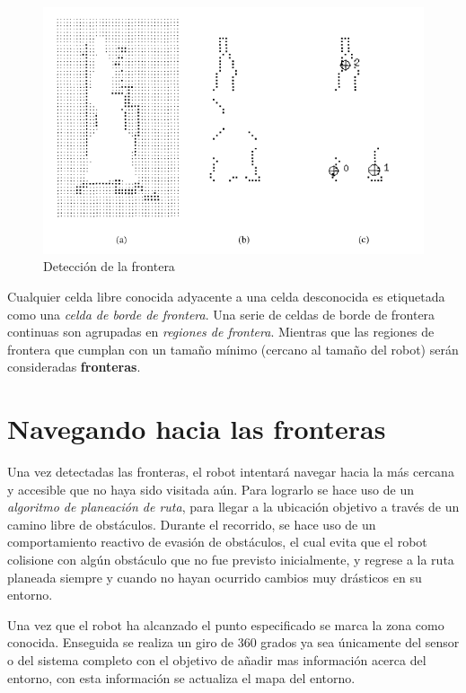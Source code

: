 \documentclass[11pt]{article}
\begin{document}
\begin{figure}
	\centering
	\includegraphics[scale=0.5]{images/frontier_detection.PNG}
	\caption{Detección de la frontera}
	\label{fig:frontier1}
\end{figure}

Cualquier celda libre conocida adyacente a una celda desconocida es etiquetada como una \emph{celda de borde de frontera}. Una serie de celdas de borde de frontera continuas son agrupadas en \emph{regiones de frontera}. Mientras que las regiones de frontera que cumplan con un tamaño mínimo (cercano al tamaño del robot) serán consideradas \textbf{fronteras}.

\section{Navegando hacia las fronteras}

Una vez detectadas las fronteras, el robot intentará navegar hacia la más cercana y accesible que no haya sido visitada aún. Para lograrlo se hace uso de un \emph{algoritmo de planeación de ruta}, para llegar a la ubicación objetivo a través de un camino libre de obstáculos. Durante el recorrido, se hace uso de un comportamiento reactivo de evasión de obstáculos, el cual evita que el robot colisione con algún obstáculo que no fue previsto inicialmente, y regrese a la ruta planeada siempre y cuando no hayan ocurrido cambios muy drásticos en su entorno.

Una vez que el robot ha alcanzado el punto especificado se marca la zona como conocida. Enseguida se realiza un giro de 360 grados ya sea únicamente del sensor o del sistema completo con el objetivo de añadir mas información acerca del entorno, con esta información se actualiza el mapa del entorno.
\end{document}
